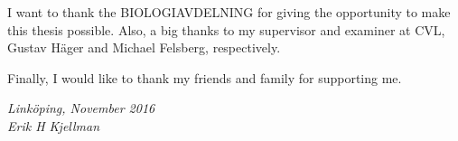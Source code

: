 \begin{acknowledgments}
  I want to thank the BIOLOGIAVDELNING for giving the opportunity to make this thesis possible. Also, a big thanks to my supervisor and examiner at CVL, Gustav Häger and Michael Felsberg, respectively.

Finally, I would like to thank my friends and family for supporting me. 

  \addvspace{1em}
  \begin{flushright}
    \textit{%
      Linköping, November 2016\\
      Erik H Kjellman%
    }
  \end{flushright}
\end{acknowledgments}
